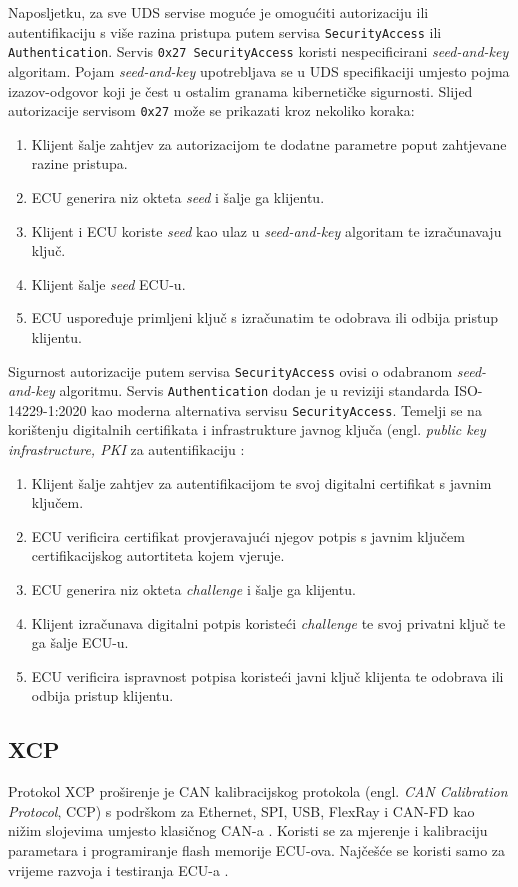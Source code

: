 \documentclass[times, utf8, diplomski, numeric]{fer}
\begin{document}
Naposljetku, za sve UDS servise moguće je omogućiti autorizaciju ili autentifikaciju s više razina pristupa putem servisa \texttt{SecurityAccess} ili \texttt{Authentication}. Servis \texttt{0x27 SecurityAccess} koristi nespecificirani \textit{seed-and-key} algoritam. Pojam \textit{seed-and-key} upotrebljava se u UDS specifikaciji umjesto pojma izazov-odgovor  koji je čest u ostalim granama kibernetičke sigurnosti. Slijed autorizacije servisom \texttt{0x27} može se prikazati kroz nekoliko koraka:
\begin{enumerate}
    \item Klijent šalje zahtjev za autorizacijom te dodatne parametre poput zahtjevane razine pristupa.
    \item ECU generira niz okteta \textit{seed} i šalje ga klijentu.
    \item Klijent i ECU koriste \textit{seed} kao ulaz u \textit{seed-and-key} algoritam te izračunavaju ključ.
    \item Klijent šalje \textit{seed} ECU-u.
    \item ECU uspoređuje primljeni ključ s izračunatim te odobrava ili odbija pristup klijentu.
\end{enumerate}
Sigurnost autorizacije putem servisa \texttt{SecurityAccess} ovisi o odabranom \textit{seed-and-key} algoritmu.
Servis \texttt{Authentication} dodan je u reviziji standarda ISO-14229-1:2020 kao moderna alternativa servisu \texttt{SecurityAccess}. Temelji se na korištenju digitalnih certifikata i infrastrukture javnog ključa (engl. \textit{public key infrastructure, PKI} za autentifikaciju \cite{vector2021uds}:
\begin{enumerate}
    \item Klijent šalje zahtjev za autentifikacijom te svoj digitalni certifikat s javnim ključem.
    \item ECU verificira certifikat provjeravajući njegov potpis s javnim ključem certifikacijskog autortiteta kojem vjeruje.
    \item ECU generira niz okteta \textit{challenge} i šalje ga klijentu.
    \item Klijent izračunava digitalni potpis koristeći \textit{challenge} te svoj privatni ključ te ga šalje ECU-u.
    \item ECU verificira ispravnost potpisa koristeći javni ključ klijenta te odobrava ili odbija pristup klijentu.
\end{enumerate}

\subsection{XCP}
Protokol XCP proširenje je CAN kalibracijskog protokola (engl. \textit{CAN Calibration Protocol}, CCP) s podrškom za Ethernet, SPI, USB, FlexRay i CAN-FD kao nižim slojevima umjesto klasičnog CAN-a \cite{falch2022xcp}. Koristi se za mjerenje i kalibraciju parametara i programiranje flash memorije ECU-ova. Najčešće se koristi samo za vrijeme razvoja i testiranja ECU-a \cite{falch2022xcp}.
\end{document}
